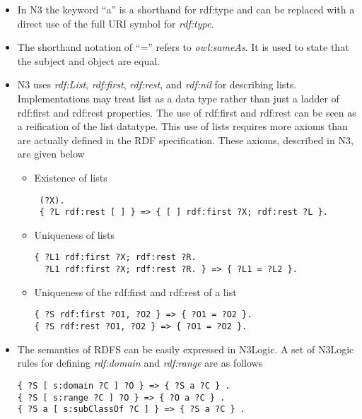\documentclass{tlp}
\begin{document}
\begin{itemize}

\item{} In N3 the keyword ``a'' is a shorthand for rdf:type and can be
  replaced with a direct use of the full URI symbol for {\it
    rdf:type}.


\item{} The shorthand notation of ``='' refers to {\it owl:sameAs}. It
  is used to state that the subject and object are equal.

\item{}N3 uses {\it rdf:List}, {\it rdf:first}, {\it rdf:rest}, and
  {\it rdf:nil} for describing lists. Implementations may treat list
  as a data type rather than just a ladder of rdf:first and rdf:rest
  properties. The use of rdf:first and rdf:rest can be seen as a
  reification of the list datatype.  This use of lists requires more
  axioms than are actually defined in the RDF specification. These
  axioms, described in N3, are given below 

\begin{itemize}

\item{Existence of lists}
\begin{verbatim}
 (?X).
 { ?L rdf:rest [ ] } => { [ ] rdf:first ?X; rdf:rest ?L }.
 \end{verbatim}

\item{Uniqueness of lists}
\begin{verbatim}
{ ?L1 rdf:first ?X; rdf:rest ?R.
  ?L1 rdf:first ?X; rdf:rest ?R. } => { ?L1 = ?L2 }.
\end{verbatim}

\item{Uniqueness of the rdf:first and rdf:rest of a list}
\begin{verbatim}
{ ?S rdf:first ?O1, ?O2 } => { ?O1 = ?O2 }.
{ ?S rdf:rest ?O1, ?O2 } => { ?O1 = ?O2 }.
\end{verbatim}

\end{itemize}

\item{} The semantics of RDFS can be easily expressed in N3Logic. A
  set of N3Logic rules for defining {\it rdf:domain} and {\it
    rdf:range} are as follows

\begin{verbatim}
{ ?S [ s:domain ?C ] ?O } => { ?S a ?C } .
{ ?S [ s:range ?C ] ?O } => { ?O a ?C } .
{ ?S a [ s:subClassOf ?C ] } => { ?S a ?C } .
\end{verbatim}

\end{itemize}
\end{document}
